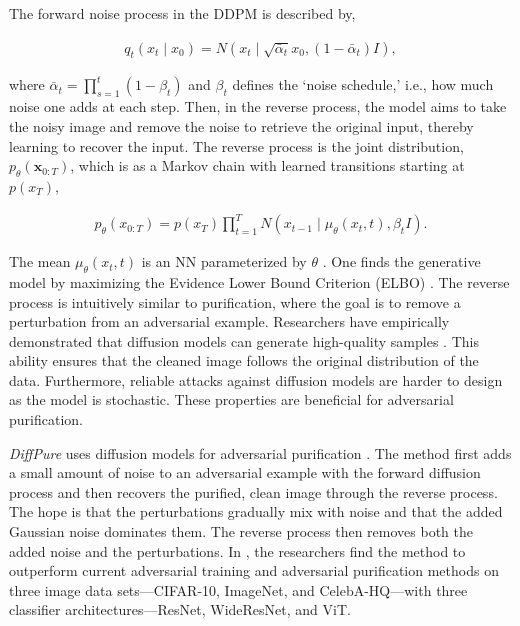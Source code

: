\documentclass[twocolumn]{article}
\begin{document}
The forward noise process in the DDPM is described by,

\begin{align}
    q_t\left(x_t \mid x_0\right)=N\left(x_t \mid \sqrt{\bar{\alpha}_t} x_0,\left(1-\bar{\alpha}_t\right) I\right),
\end{align}

where $\bar{\alpha}_t=\prod_{s=1}^t\left(1-\beta_t\right)$ and $\beta_t$ defines the `noise schedule,' i.e., how much noise one adds at each step. Then, in the reverse process, the model aims to take the noisy image and remove the noise to retrieve the original input, thereby learning to recover the input. The reverse process is the joint distribution, $p_\theta\left(\mathbf{x}_{0: T}\right)$, which is as a Markov chain with learned transitions starting at $p(x_T)$,


\begin{align}
    p_\theta\left(x_{0: T}\right)=p\left(x_T\right) \prod_{t=1}^T N\left(x_{t-1} \mid \mu_\theta\left(x_t, t\right), \beta_t I\right).
\end{align}


The mean $\mu_\theta\left(x_t, t\right)$ is an NN parameterized by $\theta$ \cite{DiffusionPaper}. One finds the generative model by maximizing the Evidence Lower Bound Criterion (ELBO) \cite{DiffusionPaper}. The reverse process is intuitively similar to purification, where the goal is to remove a perturbation from an adversarial example. Researchers have empirically demonstrated that diffusion models can generate high-quality samples \cite{DiffusionPaper}. This ability ensures that the cleaned image follows the original distribution of the data. Furthermore, reliable attacks against diffusion models are harder to design as the model is stochastic. These properties are beneficial for adversarial purification.

\emph{DiffPure} uses diffusion models for adversarial purification \cite{DiffPure}. The method first adds a small amount of noise to an adversarial example with the forward diffusion process and then recovers the purified, clean image through the reverse process. The hope is that the perturbations gradually mix with noise and that the added Gaussian noise dominates them. The reverse process then removes both the added noise and the perturbations. In \cite{DiffPure}, the researchers find the method to outperform current adversarial training and adversarial purification methods on three image data sets---CIFAR-10, ImageNet, and CelebA-HQ---with three classifier architectures---ResNet, WideResNet, and ViT.
\end{document}

